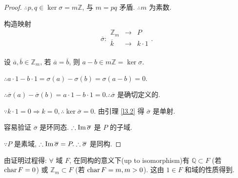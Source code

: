 \documentclass[color=black,device=normal,lang=cn,mode=geye]{elegantnote}
\begin{document}
\begin{proof}
    $\therefore p,q\in\ker\sigma=m\mathbb{Z}$, 与 $m=pq$ 矛盾. $\therefore m$ 为素数.

    构造映射
    \[\overline{\sigma}:\begin{array}{rcl}
        \mathbb{Z}_m & \to & P \\
        \overline{k} & \to & k\cdot1 \\
    \end{array}.\]

    设 $\overline{a},\overline{b}\in\mathbb{Z}_m$, 若 $\overline{a}=\overline{b}$, 则 $a-b\in m\mathbb{Z}=\ker\sigma$.

    $\therefore a\cdot1-b\cdot1=\sigma(a)-\sigma(b)=\sigma(a-b)=0$.

    $\therefore\overline{\sigma}(a)-\overline{\sigma}(b)=a\cdot1-b\cdot1=0.\therefore\overline{\sigma}$ 是确切定义的.

    $\because k\cdot1=0\Rightarrow k=0,\therefore\ker\overline{\sigma}=0$. 由引理 \ref{l3.2} 得 $\overline{\sigma}$ 是单射.

    容易验证 $\overline{\sigma}$ 是环同态. $\therefore\operatorname{Im} \overline{\sigma}$ 是 $P$ 的子域.

    $\because P$ 是素域, $\therefore\operatorname{Im} \overline{\sigma}=P.\therefore\overline{\sigma}$ 是同构.
\end{proof}
由证明过程得: $\forall$ 域 $F$, 在同构的意义下(up to isomorphism)有 $\mathbb{Q}\subset F$ (若 $\operatorname{char} F=0$) 或 $\mathbb{Z}_m\subset F$ (若 $\operatorname{char} F=m,m>0$). 这由 $1\in F$ 和域的性质得到.
\end{document}
